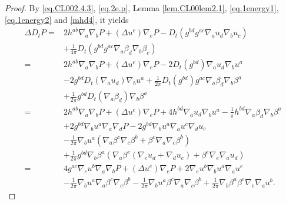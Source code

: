 \documentclass[12pt,reqno]{amsart}
\numberwithin{equation}{section}
\theoremstyle{definition}
\theoremstyle{remark}
\begin{document}
\begin{proof}
By \eqref{eq.CL002.4.3}, \eqref{eq.2e.p}, Lemma \ref{lem.CL00lem2.1}, \eqref{eq.1energy1}, \eqref{eq.1energy2} and \eqref{mhd4},  it yields
\begin{align*}
  \Delta D_t {P }=&2h^{ab}{\nabla}_a{\nabla}_b{P }+(\Delta u^e){\nabla}_e {P }-D_t(g^{bd}g^{ac}{\nabla}_a u_d{\nabla}_b u_c)\\
  &+\frac{1}{4\pi}D_t(g^{bd}g^{ac}{\nabla}_a \beta_d {\nabla}_b \beta_c)\\
  =&2h^{ab}{\nabla}_a{\nabla}_b{P }+(\Delta u^e){\nabla}_e {P }-2D_t(g^{bd}){\nabla}_a u_d{\nabla}_b u^a\\
  &-2 g^{bd}D_t({\nabla}_a u_d){\nabla}_b u^a+\frac{1}{2\pi} D_t(g^{bd}) g^{ac}{\nabla}_a \beta_d {\nabla}_b \beta^a \\
  &+ \frac{1}{2\pi}g^{bd} D_t({\nabla}_a \beta_d){\nabla}_b\beta^a\\
  =&2h^{ab}{\nabla}_a{\nabla}_b{P }+(\Delta u^e){\nabla}_e {P }+4h^{bd}{\nabla}_a u_d{\nabla}_b u^a-\frac{1}{\pi} h^{bd} {\nabla}_a \beta_d {\nabla}_b\beta^a\\
  &+2 g^{bd}{\nabla}_b u^a {\nabla}_a{\nabla}_d{P } -2 g^{bd}{\nabla}_b u^a{\nabla}_a u^c{\nabla}_du_c\\
  &-\frac{1}{2\pi} {\nabla}_b u^a({\nabla}_a\beta^c {\nabla}_c\beta^b+\beta^c{\nabla}_a{\nabla}_c\beta^b)\\
  &+ \frac{1}{2\pi}g^{bd}{\nabla}_b\beta^a\left({\nabla}_a\beta^e({\nabla}_e u_d+{\nabla}_d u_e)+\beta^e{\nabla}_e{\nabla}_a u_d\right)\\
  =&4g^{ac}{\nabla}_c u^b{\nabla}_a{\nabla}_b{P }+(\Delta u^e){\nabla}_e {P }+2{\nabla}_e u^b{\nabla}_b u^a{\nabla}_a u^e\\
  &-\frac{1}{2\pi} {\nabla}_b u^a{\nabla}_a\beta^c {\nabla}_c\beta^b-\frac{1}{2\pi} {\nabla}_b u^a\beta^c{\nabla}_a{\nabla}_c\beta^b+ \frac{1}{2\pi}{\nabla}_b\beta^a\beta^e{\nabla}_e{\nabla}_a u^b.
\end{align*}


\end{proof}
\end{document}
